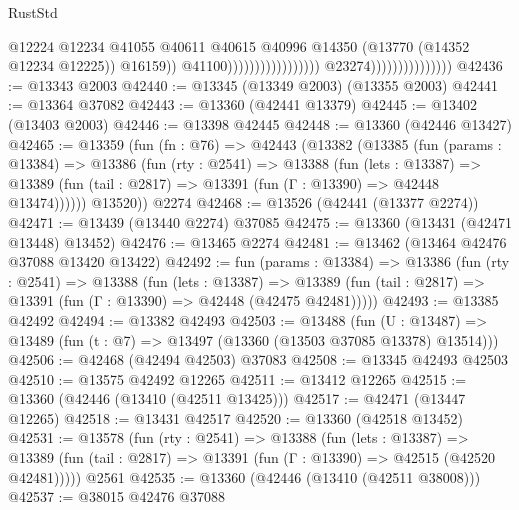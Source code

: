 \begin{lexlean}{RustStd}
\begin{coremodule}
                                                                        @12224
                                                                        @12234
                                                                        @41055
                                                                        @40611
                                                                        @40615
                                                                        @40996
                                                                        @14350
                                                                        (@13770
                                                                          (@14352 @12234 @12225))
                                                                        @16159))
                                                                    @41100)))))))))))))))))
                                  @23274)))))))))))))))
@42436 := @13343 @2003
@42440 := @13345 (@13349 @2003) (@13355 @2003)
@42441 := @13364 @37082
@42443 := @13360 (@42441 @13379)
@42445 := @13402 (@13403 @2003)
@42446 := @13398 @42445
@42448 := @13360 (@42446 @13427)
@42465 := @13359
    (fun (fn : @76) =>
    @42443
      (@13382
        (@13385
          (fun (params : @13384) =>
          @13386
            (fun (rty : @2541) =>
            @13388
              (fun (lets : @13387) =>
              @13389 (fun (tail : @2817) => @13391 (fun (Γ : @13390) => @42448 @13474))))))
        @13520))
    @2274
@42468 := @13526 (@42441 (@13377 @2274))
@42471 := @13439 (@13440 @2274) @37085
@42475 := @13360 (@13431 (@42471 @13448) @13452)
@42476 := @13465 @2274
@42481 := @13462 (@13464 @42476 @37088 @13420 @13422)
@42492 := fun (params : @13384) =>
  @13386
    (fun (rty : @2541) =>
    @13388
      (fun (lets : @13387) =>
      @13389 (fun (tail : @2817) => @13391 (fun (Γ : @13390) => @42448 (@42475 @42481)))))
@42493 := @13385 @42492
@42494 := @13382 @42493
@42503 := @13488
    (fun (U : @13487) => @13489 (fun (t : @7) => @13497 (@13360 (@13503 @37085 @13378) @13514)))
@42506 := @42468 (@42494 @42503) @37083
@42508 := @13345 @42493 @42503
@42510 := @13575 @42492 @12265
@42511 := @13412 @12265
@42515 := @13360 (@42446 (@13410 (@42511 @13425)))
@42517 := @42471 (@13447 @12265)
@42518 := @13431 @42517
@42520 := @13360 (@42518 @13452)
@42531 := @13578
    (fun (rty : @2541) =>
    @13388
      (fun (lets : @13387) =>
      @13389 (fun (tail : @2817) => @13391 (fun (Γ : @13390) => @42515 (@42520 @42481)))))
    @2561
@42535 := @13360 (@42446 (@13410 (@42511 @38008)))
@42537 := @38015 @42476 @37088

\end{coremodule}
\end{lexlean}
